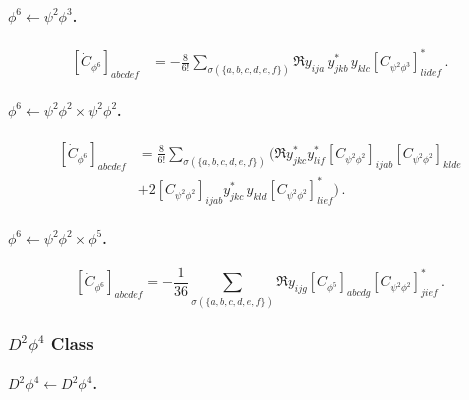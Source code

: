 \paragraph{\texorpdfstring{$\phi^6\leftarrow \psi^2\phi^3$}{phi6frompsi2phi3}.}

\begin{align}
    \left[\dot{C}_{\phi^6}\right]_{abcdef} &= - \frac{8}{6!}\sum_{\sigma(\{a,b,c,d,e,f\})} \Re{y_{ija}\, y_{jkb}^*\, y_{klc}\left[C_{\psi^2\phi^3}\right]_{lidef}^*}\,.\label{phi6_psi2phi3}
\end{align}

\paragraph{\texorpdfstring{$\phi^6\leftarrow \psi^2\phi^2\times\psi^2\phi^2$}{phi6frompsi2phi2xpsi2phi2}.}

\begin{align}
    \left[\dot C_{\phi^6}\right]_{abcdef} &= \frac{8}{6!} \sum_{\sigma(\{a,b,c,d,e,f\})}\Bigg(\Re{ y^*_{jkc} y^*_{lif} \left[C_{\psi^2\phi^2}\right]_{ijab} \left[C_{\psi^2\phi^2}\right]_{klde}}\\ \nonumber
     &+2 \left[C_{\psi^2\phi^2}\right]_{ijab} y^*_{jkc} \, y_{kld} \left[C_{\psi^2\phi^2}\right]^*_{lief}\Bigg)\,.
     \label{phi6_psi2phi2xpsi2phi2}
\end{align}

\paragraph{\texorpdfstring{$\phi^6\leftarrow \psi^2\phi^2\times\phi^5$}{phi6frompsi2phi2xphi5}.}
\begin{equation}
    \left[\dot{C}_{\phi^6}\right]_{abcdef} = -\frac{1}{36} \sum_{\sigma(\{a,b,c,d,e,f\})} \Re{
      y_{ijg} \left[C_{\phi^5}\right]_{abcdg} \left[C_{\psi^2\phi^2}\right]^*_{jief}}
     \label{phi6_psi2phi2xphi5}\,.
\end{equation}

\subsubsection{\texorpdfstring{$D^2\phi^4$}{D2phi4} Class}
\label{sec:D2phi4RGE}

\paragraph{\texorpdfstring{$D^2\phi^4\leftarrow D^2\phi^4$}{D2phi4fromD2phi4}.}
\label{par:D2phi4<-D2phi4}

